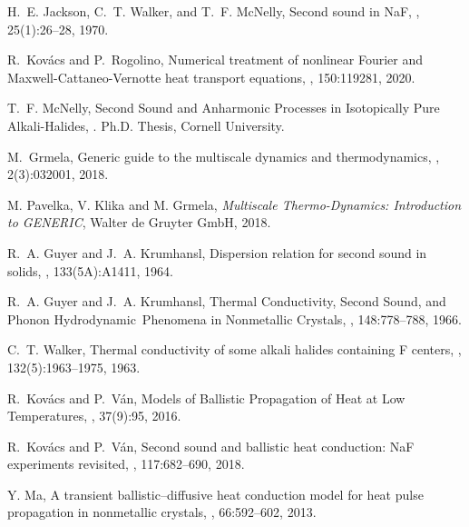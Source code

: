 \documentclass[sn-mathphys]{sn-jnl}%
\theoremstyle{thmstyleone}%
\theoremstyle{thmstyletwo}%
\theoremstyle{thmstylethree}%
\begin{document}
\begin{thebibliography}{9}
	H.~E. Jackson, C.~T. Walker, and T.~F. McNelly,
	\newblock Second sound in {N}a{F},
	, 25(1):26--28, 1970.
	
	R.~Kov\'acs and P.~Rogolino,
	\newblock Numerical treatment of nonlinear {F}ourier and
	{M}axwell-{C}attaneo-{V}ernotte heat transport equations,
	, 150:119281,
	2020.
	
	T.~F. McNelly,
	\newblock Second {S}ound and {A}nharmonic {P}rocesses in {I}sotopically {P}ure
	{A}lkali-{H}alides,
	.
	\newblock Ph.D. Thesis, Cornell University.
	
	M.~Grmela,
	\newblock Generic guide to the multiscale dynamics and thermodynamics,
	, 2(3):032001, 2018.
	
	M. Pavelka, V. Klika and M. Grmela,
	\emph{Multiscale Thermo-Dynamics: Introduction to GENERIC}, Walter de Gruyter GmbH, 2018.
	
	R.~A. Guyer and J.~A. Krumhansl,
	\newblock Dispersion relation for second sound in solids,
	, 133(5A):A1411, 1964.
	
	R.~A. Guyer and J.~A. Krumhansl,
	\newblock Thermal {C}onductivity, {S}econd {S}ound, and {P}honon {H}ydrodynamic {P}henomena in {N}onmetallic {C}rystals,
	, 148:778--788, 1966.
	
	C.~T. Walker,
	\newblock Thermal conductivity of some alkali halides containing {F} centers,
	, 132(5):1963--1975, 1963.
	
	R.~Kov\'acs and P.~V\'an,
	\newblock Models of Ballistic Propagation of Heat at Low Temperatures,
	, 37(9):95, 2016.
	
	R.~Kov\'acs and P.~V\'an,
	\newblock Second sound and ballistic heat conduction: {N}a{F} experiments
	revisited,
	, 117:682--690,
	2018.
	
	Y. Ma,
	\newblock A transient ballistic--diffusive heat conduction model for heat pulse
	propagation in nonmetallic crystals,
	, 66:592--602,
	2013.
	

\end{thebibliography}
\end{document}
